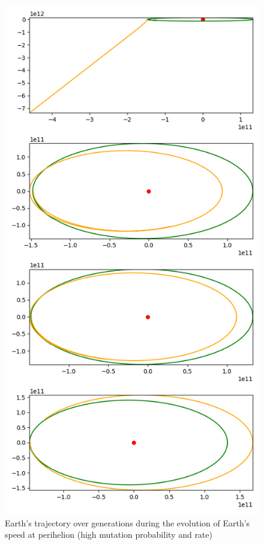 \begin{figure}
    \center
    \includegraphics[scale=.3]{img/perihelion_speed_test_0.90_0.90_10_5.png}
    \caption{Earth's trajectory over generations during the evolution of
        Earth's speed at perihelion (high mutation probability and rate)}
    \label{speed_high}
\end{figure}